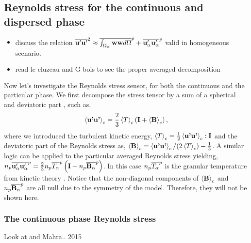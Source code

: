 \subsection{Reynolds stress for the continuous and dispersed phase}

\begin{itemize}
    \item discuss the relation 
    $\overline{\textbf{u}' \textbf{u}'}^2 
    \approx \overline{\int_{\Omega_\alpha}  \textbf{ww} d\Omega}^{p}
    + \overline{\textbf{u}_\alpha'\textbf{u}_\alpha'}^{p}$
    valid in homogeneous scenario.
    \item  read le cluzeau and G bois to see the proper averaged decomposition
\end{itemize}

Now let's investigate the Reynolds stress sensor, for both the continuous and the particular phase.
We first decompose the stress tensor by a sum of a spherical and deviatoric part \citep[chapter 6]{morel2015mathematical}, such as, 
\begin{equation*}
    \left<\textbf{u'u'}\right>_c
    = \frac{2}{3}\left<T\right>_c\left(
        \textbf{I}
        + \left<\textbf{B}\right>_c
    \right),
\end{equation*}
where we introduced the turbulent kinetic energy, $\left<T\right>_c = \frac{1}{2}\left<\textbf{u'u'}\right>_c:\textbf{I}$ and the deviatoric part of the Reynolds stress as, 
$\left<\textbf{B}\right>_c = \left<\textbf{u'u'}\right>_c/(2\left<T\right>_c) - \frac{1}{3}$.
A similar logic can be applied to the particular averaged Reynolds stress yielding, 
$
n_p\overline{\textbf{u}'_\alpha \textbf{u}_\alpha'}^{p}
    = \frac{2}{3}n_p\overline{T_\alpha}^{p}\left(
        \textbf{I}
        + n_p\overline{\textbf{B}_\alpha}^{p}
    \right)
$.
In this case $n_p\overline{T_\alpha}^{p}$ is the granular temperature from kinetic theory \citep{rao2008introduction}. 
Notice that the non-diagonal components of $\left<\textbf{B}\right>_c$ and  $n_p\overline{\textbf{B}_\alpha}^{p}$ are all null due to the symmetry of the model. 
Therefore, they will not be shown here. 
\subsubsection{The continuous phase Reynolds stress}

Look at \citep{wang2021numerical} and Mahra.. 2015 



